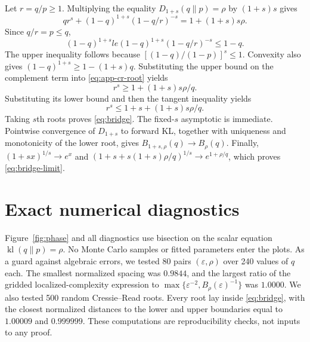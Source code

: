 \documentclass{article}
\theoremstyle{remark}
\newcommand{\kl}{\operatorname{kl}}
\newcommand{\eps}{\varepsilon}
\begin{document}
Let $r=q/p\ge1$.  Multiplying the equality
$D_{1+s}(q\|p)=\rho$ by $(1+s)s$ gives
\begin{equation}
 qr^s+(1-q)^{1+s}(1-q/r)^{-s}=1+(1+s)s\rho.
 \label{eq:app-cr-root}
\end{equation}
Since $q/r=p\le q$,
\[
 (1-q)^{1+s}le
 (1-q)^{1+s}(1-q/r)^{-s}\le1-q.
\]
The upper inequality follows because
$[(1-q)/(1-p)]^s\le1$.  Convexity also gives
$(1-q)^{1+s}\ge1-(1+s)q$.  Substituting the upper bound on the complement
term into \eqref{eq:app-cr-root} yields
\[
 r^s\ge1+(1+s)s\rho/q.
\]
Substituting its lower bound and then the tangent inequality yields
\[
 r^s\le1+s+(1+s)s\rho/q.
\]
Taking $s$th roots proves \eqref{eq:bridge}.  The fixed-$s$ asymptotic is
immediate.  Pointwise convergence of $D_{1+s}$ to forward KL, together with
uniqueness and monotonicity of the lower root, gives
$B_{1+s,\rho}(q)\to B_\rho(q)$.  Finally,
$(1+sx)^{1/s}\to e^x$ and
$(1+s+s(1+s)\rho/q)^{1/s}\to e^{1+\rho/q}$, which proves
\eqref{eq:bridge-limit}.

\section{Exact numerical diagnostics}
\label{app:numerics}

Figure~\ref{fig:phase} and all diagnostics use bisection on the scalar equation
$\kl(q\|p)=\rho$.  No Monte Carlo samples or fitted parameters enter the
plots.  As a guard against algebraic errors, we tested 80 pairs
$(\eps,\rho)$ over 240 values of $q$ each.  The smallest normalized spacing
was $0.9844$, and the largest ratio of the gridded localized-complexity
expression to
$\max\{\eps^{-2},B_\rho(\eps)^{-1}\}$ was $1.0000$.  We also tested 500
random Cressie--Read roots.  Every root lay inside \eqref{eq:bridge}, with the
closest normalized distances to the lower and upper boundaries equal to
$1.00009$ and $0.999999$.  These computations are reproducibility checks, not
inputs to any proof.
\end{document}
